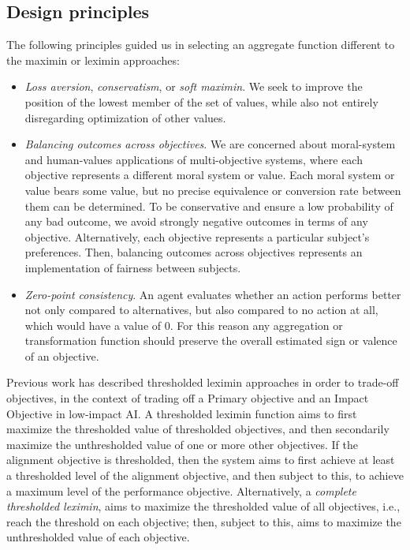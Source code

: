 \subsection{Design principles}
The following principles guided us in selecting an aggregate function different to the maximin or leximin approaches:
\begin{itemize}
    \item \textit{Loss aversion}, \textit{conservatism}, or \textit{soft maximin}. We seek to improve the position of the lowest member of the set of values, while also not entirely disregarding optimization of other values.
    \item \textit{Balancing outcomes across objectives}. %
    We are concerned about moral-system and human-values applications of multi-objective systems, where each objective represents a different moral system or value. Each moral system or value bears some value, but no precise equivalence or conversion rate between them can be determined. To be conservative and ensure a low probability of any bad outcome, we avoid strongly negative outcomes in terms of any objective. Alternatively, each objective represents a particular subject's preferences. Then, balancing outcomes across objectives represents an implementation of fairness between subjects.
    \item \textit{Zero-point consistency}. An agent evaluates whether an action performs better not only compared to alternatives, but also compared to no action at all, which would have a value of 0. For this reason any aggregation or transformation function should preserve the overall estimated sign or valence of an objective.
\end{itemize}

Previous work \cite{vamplew_potential-based_2021} has described thresholded leximin approaches in order to trade-off objectives, in the context of trading off a Primary objective and an Impact Objective in low-impact AI. A thresholded leximin function aims to first maximize the thresholded value of thresholded objectives, and then secondarily maximize the unthresholded value of one or more other objectives. If the alignment objective is thresholded, then the system aims to first achieve at least a thresholded level of the alignment objective, and then subject to this, to achieve a maximum level of the performance objective. Alternatively, a \textit{complete thresholded leximin}, aims to maximize the thresholded value of all objectives, i.e., reach the threshold on each objective; then, subject to this, aims to maximize the unthresholded value of each objective.

